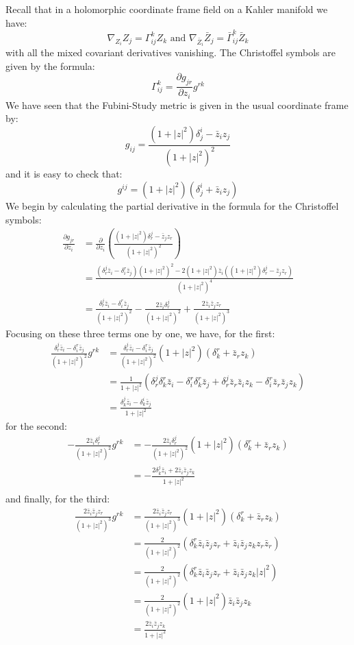 \documentclass[11pt]{amsart}
\theoremstyle{definition}
\def \del{ \partial }
\begin{document}
Recall that in a holomorphic coordinate frame field on a Kahler manifold we have:
%
$$\nabla_{ Z_i }{ Z_j }= \Gamma^k_{ij} Z_k \text{ and } \nabla_{ \bar{Z}_i }{ \bar{Z}_j } = \bar{ \Gamma }^k_{ij} \bar{Z}_k $$
%
with all the mixed covariant derivatives vanishing.  The Christoffel symbols are given by the formula:
%
$$ \Gamma^k_{ij} = \frac{ \del g_{jr} }{\del z_i} g^{rk} $$
%
We have seen that the Fubini-Study metric is given in the usual coordinate frame by:
%
$$ g_{ij} = \frac{ (1 + |z|^2)\delta^i_j - \bar{z}_i z_j }{ (1 + |z|^2)^2 } $$
%
and it is easy to check that:
%
$$g^{ij} = (1 + |z|^2)( \delta^i_j + \bar{z}_i z_j )$$
%
We begin by calculating the partial derivative in the formula for the Christoffel symbols:
%
\begin{align*}
\frac{ \del g_{jr} }{\del z_i} &= \frac{\del}{ \del z_i }\left( \frac{ (1 + |z|^2) \delta^j_r - \bar{z}_j z_r }{ (1 + |z|^2)^2 } \right) \\
&= \frac{ ( \delta^j_r \bar{z}_i - \delta^r_i \bar{z}_j ) (1 + |z|^2 )^2 - 2 (1 + |z|^2 ) \bar{z}_i( (1 + |z|^2)\delta^j_r - \bar{z}_j z_r )}{ (1 + |z|^2 )^4 } \\
&= \frac{ \delta^j_r \bar{z}_i - \delta^r_i \bar{z}_j }{ (1 + |z|^2)^2 } - \frac{ 2 \bar{z}_i \delta^j_r }{ (1 + |z|^2)^2 } + \frac{ 2 \bar{z}_i \bar{z}_j z_r }{ (1 + |z|^2)^3 }
\end{align*}
%
Focusing on these three terms one by one, we have, for the first:
%
\begin{align*}
\frac{ \delta^j_r \bar{z}_i - \delta^r_i \bar{z}_j }{ (1 + |z|^2)^2 } g^{rk} &= \frac{ \delta^j_r \bar{z}_i - \delta^r_i \bar{z}_j }{ (1 + |z|^2)^2 } (1 + |z|^2)( \delta^r_k + \bar{z}_r z_k ) \\
&= \frac{1}{ 1 + |z|^2 } ( \delta^j_r \delta^r_k \bar{z}_i - \delta^r_i \delta^r_k \bar{z}_j + \delta^j_r \bar{z}_r \bar{z}_i z_k - \delta^r_i \bar{z}_r \bar{z}_j z_k ) \\
&= \frac{ \delta^j_k \bar{z}_i - \delta^i_k \bar{z}_j }{ 1 + |z|^2 }
\end{align*}
%
for the second:
%
\begin{align*}
- \frac{ 2 \bar{z}_i \delta^j_r }{ (1 + |z|^2)^2 }g^{rk} &= - \frac{ 2 \bar{z}_i \delta^j_r }{ (1 + |z|^2)^2 }(1 + |z|^2)( \delta^r_k + \bar{z}_r z_k ) \\
&= - \frac{2 \delta^j_k \bar{z}_i + 2 \bar{z}_i \bar{z}_j z_k}{1 + |z|^2}\\
\end{align*}
%
and finally, for the third:
%
\begin{align*}
\frac{ 2 \bar{z}_i \bar{z}_j z_r }{ (1 + |z|^2)^3 } g^{rk} &= \frac{ 2 \bar{z}_i \bar{z}_j z_r }{ (1 + |z|^2)^3 } (1 + |z|^2)( \delta^r_k + \bar{z}_r z_k ) \\
&= \frac{2}{(1 + |z|^2)^2}( \delta^r_k \bar{z}_i \bar{z}_j z_r + \bar{z}_i \bar{z}_j z_k z_r \bar{z}_r ) \\
&= \frac{2}{(1 + |z|^2)^2}( \delta^r_k \bar{z}_i \bar{z}_j z_r + \bar{z}_i \bar{z}_j z_k |z|^2 ) \\
&= \frac{2}{(1 + |z|^2)^2}(1 + |z|^2)\bar{z}_i \bar{z}_j z_k  \\
&= \frac{2 \bar{z}_i \bar{z}_j z_k }{1 + |z|^2}
\end{align*}
\end{document}
